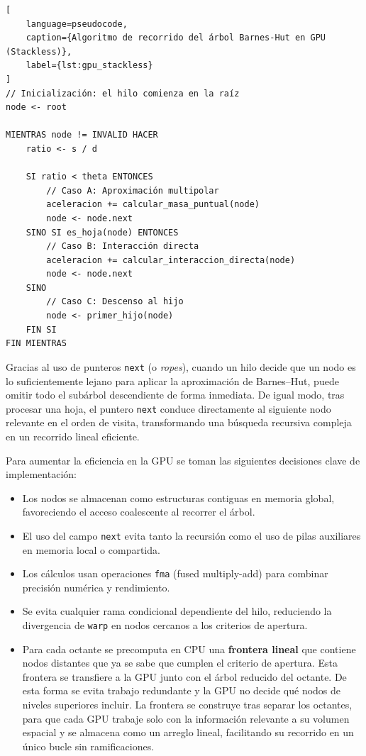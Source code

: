 \begin{lstlisting}[
    language=pseudocode,
    caption={Algoritmo de recorrido del árbol Barnes-Hut en GPU (Stackless)},
    label={lst:gpu_stackless}
]
// Inicialización: el hilo comienza en la raíz
node <- root

MIENTRAS node != INVALID HACER
    ratio <- s / d

    SI ratio < theta ENTONCES
        // Caso A: Aproximación multipolar
        aceleracion += calcular_masa_puntual(node)
        node <- node.next
    SINO SI es_hoja(node) ENTONCES
        // Caso B: Interacción directa
        aceleracion += calcular_interaccion_directa(node)
        node <- node.next
    SINO
        // Caso C: Descenso al hijo
        node <- primer_hijo(node)
    FIN SI
FIN MIENTRAS
\end{lstlisting}

Gracias al uso de punteros \texttt{next} (o \emph{ropes}), cuando un hilo decide que un nodo es lo suficientemente lejano para aplicar la aproximación de Barnes--Hut, puede omitir todo el subárbol descendiente de forma inmediata.
De igual modo, tras procesar una hoja, el puntero \texttt{next} conduce directamente al siguiente nodo relevante en el orden de visita, transformando una búsqueda recursiva compleja en un recorrido lineal eficiente.

Para aumentar la eficiencia en la GPU se toman las siguientes decisiones clave de implementación:
\begin{itemize}
    \item Los nodos se almacenan como estructuras contiguas en memoria global, favoreciendo el acceso coalescente al recorrer el árbol.
    \item El uso del campo \texttt{next} evita tanto la recursión como el uso de pilas auxiliares en memoria local o compartida.
    \item Los cálculos usan operaciones \texttt{fma} (fused multiply-add) para combinar precisión numérica y rendimiento.
    \item Se evita cualquier rama condicional dependiente del hilo, reduciendo la divergencia de \texttt{warp} en nodos cercanos a los criterios de apertura.
    \item Para cada octante se precomputa en CPU una \textbf{frontera lineal} que contiene nodos distantes que ya se sabe que cumplen el criterio de apertura.
    Esta frontera se transfiere a la GPU junto con el árbol reducido del octante.
    De esta forma se evita trabajo redundante y la GPU no decide qué nodos de niveles superiores incluir.
    La frontera se construye tras separar los octantes, para que cada GPU trabaje solo con la información relevante a su volumen espacial y se almacena como un arreglo lineal, facilitando su recorrido en un único bucle sin ramificaciones.
\end{itemize}

